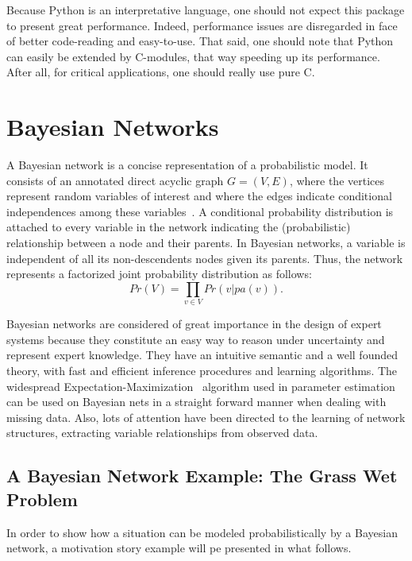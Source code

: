 \documentclass[10pt,a4paper]{report}
\begin{document}
Because Python is an interpretative language, one should not expect this package to present great performance. Indeed, performance issues are disregarded in face of better code-reading and easy-to-use. That said, one should note that Python can easily be extended by C-modules, that way speeding up its performance. After all, for critical applications, one should really use pure C. 

\section{Bayesian Networks}

A Bayesian network is a concise representation of a probabilistic model. It consists of an annotated direct acyclic graph $G=(V,E)$, where the vertices represent random variables of interest and where the edges indicate conditional independences among these variables~\cite{cowell99}. A conditional probability distribution is attached to every variable in the network indicating the (probabilistic) relationship between a node and their parents. In Bayesian networks, a variable is independent of all its non-descendents nodes given its parents. Thus, the network represents a factorized joint probability distribution as follows:
\[
  Pr(V) = \prod_{v \in V}{Pr(v|pa(v))}.
\]

Bayesian networks are considered of great importance in the design of expert systems because they constitute an easy way to reason under uncertainty and represent expert knowledge. They have an intuitive semantic and a well founded theory, with fast and efficient inference procedures and learning algorithms. The widespread Expectation-Maximization~\cite{dempster77} algorithm used in parameter estimation can be used on Bayesian nets in a straight forward manner when dealing with missing data. Also, lots of attention have been directed to the learning of network structures, extracting variable relationships from observed data. 

\subsection{A Bayesian Network Example: The Grass Wet Problem}
In order to show how a situation can be modeled probabilistically by a Bayesian network, a motivation story example will pe presented in what follows.
\end{document}
